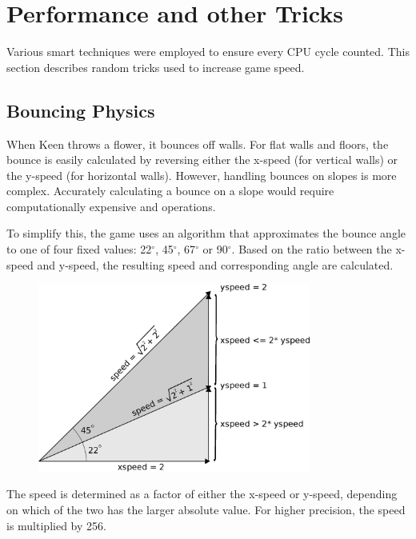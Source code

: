 \documentclass[book.tex]{subfiles}
\begin{document}
\section{Performance and other Tricks}
Various smart techniques were employed to ensure every CPU cycle counted. This section describes random tricks used to increase game speed.


\subsection{Bouncing Physics}
When Keen throws a flower, it bounces off walls. For flat walls and floors, the bounce is easily calculated by reversing either the x-speed (for vertical walls) or the y-speed (for horizontal walls). However, handling bounces on slopes is more complex. Accurately calculating a bounce on a slope would require computationally expensive  and  operations.\\

\par
To simplify this, the game uses an algorithm that approximates the bounce angle to one of four fixed values: 22$^{\circ}$, 45$^{\circ}$, 67$^{\circ}$ or 90$^{\circ}$. Based on the ratio between the x-speed and y-speed, the resulting speed and corresponding angle are calculated.\\

\par
\begin{figure}[H]
\centering
\includegraphics[width=0.8\textwidth]{imgs/drawings/angle_0.eps}
\label{fig:angles}
\end{figure}

\par
The speed is determined as a factor of either the x-speed or y-speed, depending on which of the two has the larger absolute value. For higher precision, the speed is multiplied by 256.\\
\end{document}
